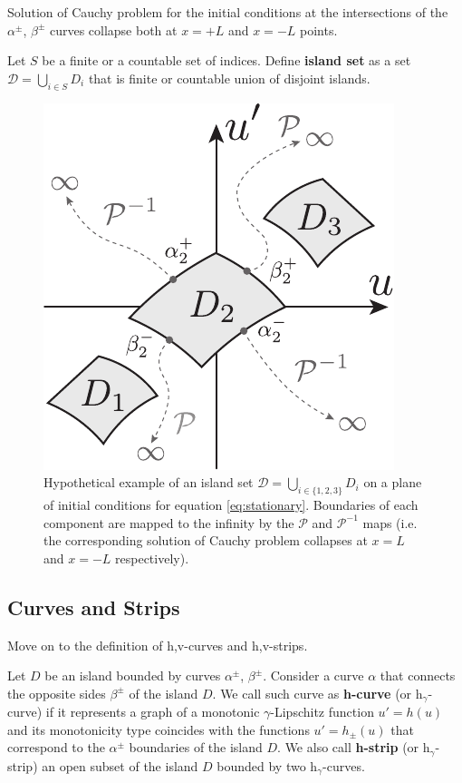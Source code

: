 \begin{remark}
	Solution of Cauchy problem for the initial conditions at the  intersections of the $\alpha^{\pm}$, $\beta^{\pm}$ curves collapse both at $x = +L$ and $x = -L$ points.
\end{remark}

\begin{definition}
	Let $S$ be a finite or a countable set of indices.
	Define {\bf island set} as a set $\mathcal{D} = \bigcup_{i \in S} D_i$ that is finite or countable union of disjoint islands.
\label{def:island-set}
\end{definition}

\begin{figure}[h]
\centering
	\includegraphics[scale = 1]{pic/island set}
	\caption{Hypothetical example of an island set $\mathcal{D} = \bigcup_{i \in \{1, 2, 3\}} D_i$ on a plane of initial conditions for equation \eqref{eq:stationary}. Boundaries of each component are mapped to the infinity by the $\mathcal{P}$ and $\mathcal{P}^{-1}$ maps (i.e. the corresponding solution of Cauchy problem collapses at $x = L$ and $x = -L$ respectively).}
\label{fig:islands-set}
\end{figure}

\subsection{Curves and Strips}

Move on to the definition of h,v-curves and h,v-strips.

\begin{definition}
	Let $D$ be an island bounded by curves $\alpha^{\pm}$, $\beta^{\pm}$.
	Consider a curve $\alpha$ that connects the opposite sides $\beta^{\pm}$ of the island $D$. 
	We call such curve as {\bf h-curve} (or $\mathrm{h}_{\gamma}$-curve) if it represents a graph of a monotonic $\gamma$-Lipschitz function $u' = h(u)$ and its monotonicity type coincides with the functions $u' = h_{\pm}(u)$ that correspond to the $\alpha^{\pm}$ boundaries of the island $D$.
	We also call {\bf h-strip} (or $\mathrm{h}_{\gamma}$-strip) an open subset of the island $D$ bounded by two $\mathrm{h}_{\gamma}$-curves.
\end{definition}

